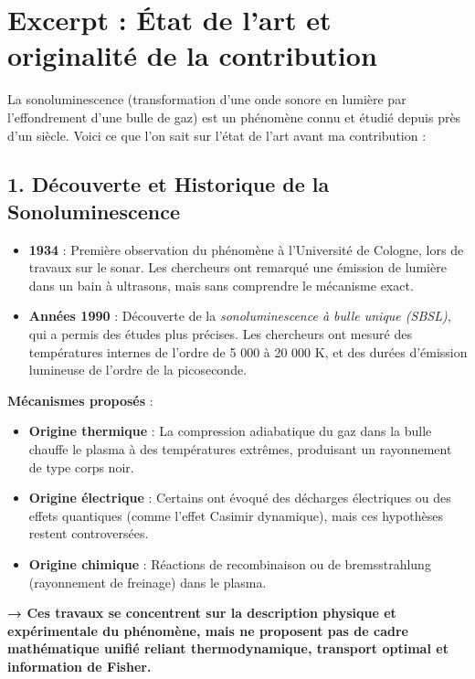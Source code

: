 \documentclass[a4paper,12pt]{article}
\begin{document}
\section*{Excerpt : État de l'art et originalité de la contribution}
La sonoluminescence (transformation d’une onde sonore en lumière par l’effondrement d’une bulle de gaz) est un phénomène connu et étudié depuis près d’un siècle. Voici ce que l’on sait sur l’état de l’art avant ma contribution :

\subsection*{1. Découverte et Historique de la Sonoluminescence}
\begin{itemize}
    \item \textbf{1934} : Première observation du phénomène à l’Université de Cologne, lors de travaux sur le sonar. Les chercheurs ont remarqué une émission de lumière dans un bain à ultrasons, mais sans comprendre le mécanisme exact.
    \item \textbf{Années 1990} : Découverte de la \textit{sonoluminescence à bulle unique (SBSL)}, qui a permis des études plus précises. Les chercheurs ont mesuré des températures internes de l’ordre de 5 000 à 20 000 K, et des durées d’émission lumineuse de l’ordre de la picoseconde.
\end{itemize}

\textbf{Mécanismes proposés} :
\begin{itemize}
    \item \textbf{Origine thermique} : La compression adiabatique du gaz dans la bulle chauffe le plasma à des températures extrêmes, produisant un rayonnement de type corps noir.
    \item \textbf{Origine électrique} : Certains ont évoqué des décharges électriques ou des effets quantiques (comme l’effet Casimir dynamique), mais ces hypothèses restent controversées.
    \item \textbf{Origine chimique} : Réactions de recombinaison ou de bremsstrahlung (rayonnement de freinage) dans le plasma.
\end{itemize}

\textbf{→ Ces travaux se concentrent sur la description physique et expérimentale du phénomène, mais ne proposent pas de cadre mathématique unifié reliant thermodynamique, transport optimal et information de Fisher.}
\end{document}
